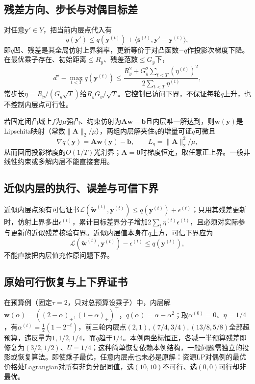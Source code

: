 \subsection{残差方向、步长与对偶目标差}

对任意$\bm y'\in Y$，把当前内层点代入有
\[
 q(\bm y')\leq q(\bm y^{(t)})
 +\langle\bm s^{(t)},\bm y'-\bm y^{(t)}\rangle,
\]
即$q$凹、残差是其全局仿射上界斜率，更新等价于对凸函数$-q$作投影次梯度下降。在最优乘子存在、初始距离$\leq R_y$、残差范数$\leq G_y$下，
\[
 d^\star-\max_{t<T}q(\bm y^{(t)})
 \leq\frac{R_y^2+G_y^2\sum_{t<T}(\eta^{(t)})^2}
 {2\sum_{t<T}\eta^{(t)}},
\]
常步长$\eta=R_y/(G_y\sqrt T)$给$R_yG_y/\sqrt T$。它控制已访问下界，不保证每轮$q$上升，也不控制内层点可行性。

若固定闭凸域上$f$为$\mu$强凸、约束仿射为$\bm A\bm w-\bm b$且内层唯一解达到，则$\bm w(\bm y)$是Lipschitz映射（常数$\|\bm A\|_2/\mu$），两组内层解夹住$q$的增量可证$q$可微且
\[
 \nabla q(\bm y)=\bm A\bm w(\bm y)-\bm b,\qquad
 L_q=\|\bm A\|_2^2/\mu,
\]
从而回用投影梯度的$O(1/T)$光滑界；$\bm A=\bm0$时梯度恒定，取任意正上界。一般非线性约束或多解内层不能直接套用。

\subsection{近似内层的执行、误差与可信下界}

近似内层点须有可信证书$\mathcal L(\widetilde{\bm w}^{(t)},\bm y^{(t)})\leq q(\bm y^{(t)})+\epsilon^{(t)}$；只用其残差更新时，仿射上界多出$\epsilon^{(t)}$，累计目标差界分子增加$2\sum_t\eta^{(t)}\epsilon^{(t)}$，且必须对实际参与更新的近似残差核验有界。近似内层值本身在$q$上方，可信下界应为
\[
 \mathcal L(\widetilde{\bm w}^{(t)},\bm y^{(t)})-\epsilon^{(t)}\leq q(\bm y^{(t)}),
\]
不能直接把内层值充作原问题下界。

\subsection{原始可行恢复与上下界证书}

在预算例（固定$\tau=2$，只对总预算设乘子）中，内层解$\bm w(\alpha)=((2-\alpha)_+,(1-\alpha)_+)^\top$，$q(\alpha)=\alpha-\alpha^2$；取$\alpha^{(0)}=0$、$\eta=1/4$，有$\alpha^{(t)}=\frac12(1-2^{-t})$，前三轮内层点$(2,1),(7/4,3/4),(13/8,5/8)$全部超预算，违反量为$1,1/2,1/4$，而$q$趋于$1/4$。本例两坐标恒正，各减一半预算残差即修复为$(3/2,1/2)$、$U=1/4$；这种简单恢复依赖本例结构，一般问题需独立的投影或恢复算法。即使乘子最优，任意内层点也未必是原解：资源LP对偶例的最优价格处Lagrangian对所有非负分配同值，选$(10,10)$不可行、选$(0,0)$可行却非最优。

